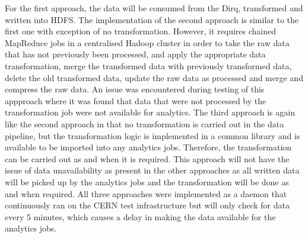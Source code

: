 For the first approach, the data will be consumed from the Dirq, transformed and written into HDFS. The implementation of the second approach is similar to the first one with exception of no transformation. However, it requires chained MapReduce jobs in a centralised Hadoop cluster in order to take the raw data that has not previously been processed, and apply the appropriate data transformation, merge the transformed data with previously transformed data, delete the old transformed data, update the raw data as processed and merge and compress the raw data. An issue was encountered during testing of this appproach where it was found that data that were not processed by the transformation job were not available for analytics. The third approach is again like the second approach in that no transformation is carried out in the data pipeline, but the transformation logic is implemented in a common library and is available to be imported into any analytics jobs. Therefore, the transformation can be carried out as and when it is required. This approach will not have the issue of data unavailability as present in the other approaches as all written data will be picked up by the analytics jobs and the transformation will be done as and when required. All three approaches were implemented as a daemon that continuously ran on the CERN test infrastructure but will only check for data every 5 minutes, which causes a delay in making the data available for the analytics jobs.

